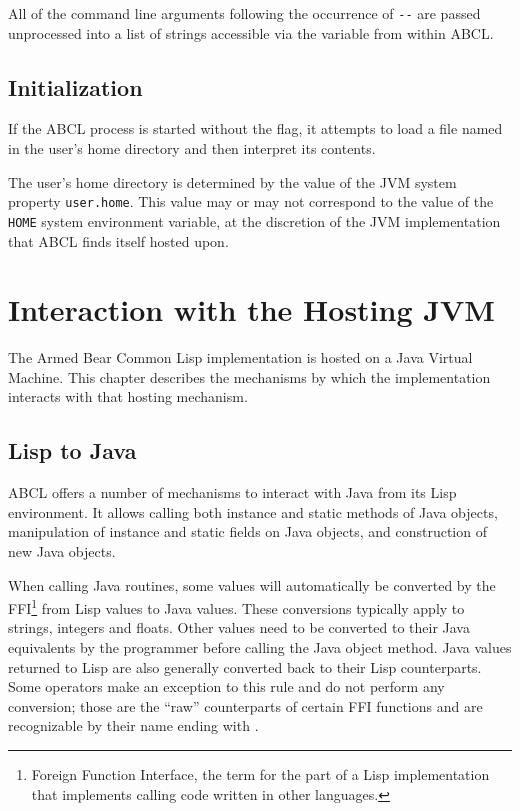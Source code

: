\documentclass[10pt]{book}
\begin{document}
All of the command line arguments following the occurrence of \verb+--+
are passed unprocessed into a list of strings accessible via the
variable  from within ABCL.

\section{Initialization}

If the \textsc{ABCL} process is started without the 
flag, it attempts to load a file named  in the user's home
directory and then interpret its contents.

The user's home directory is determined by the value of the JVM system
property \texttt{user.home}.  This value may or may not correspond
to the value of the \texttt{HOME} system environment variable, at the
discretion of the JVM implementation that \textsc{ABCL} finds itself
hosted upon.

\chapter{Interaction with the Hosting JVM}

%

The Armed Bear Common Lisp implementation is hosted on a Java Virtual
Machine.  This chapter describes the mechanisms by which the
implementation interacts with that hosting mechanism.

\section{Lisp to Java}
\label{sec:lisp-java}

\textsc{ABCL} offers a number of mechanisms to interact with Java from its
Lisp environment. It allows calling both instance and static methods
of Java objects, manipulation of instance and static fields on Java
objects, and construction of new Java objects.

When calling Java routines, some values will automatically be converted
by the FFI\footnote{Foreign Function Interface, the term for the part of
  a Lisp implementation that implements calling code written in other
  languages.}  from Lisp values to Java values. These conversions
typically apply to strings, integers and floats. Other values need to be
converted to their Java equivalents by the programmer before calling the
Java object method. Java values returned to Lisp are also generally
converted back to their Lisp counterparts. Some operators make an
exception to this rule and do not perform any conversion; those are the
``raw'' counterparts of certain FFI functions and are recognizable by
their name ending with .
\end{document}
